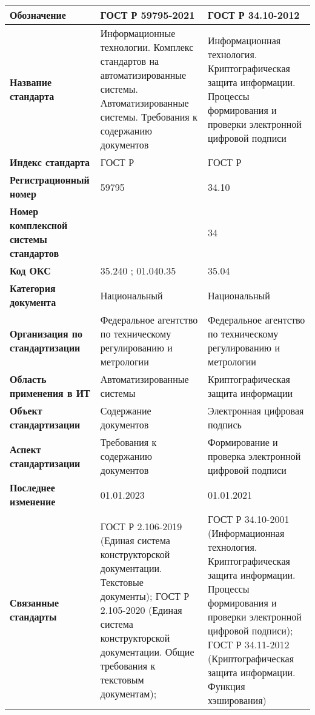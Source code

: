 \begin{table}[h!tp]
	\centering
	\caption{}
	\label{table:national}
	\begin{tabular}{|p{10em}|p{12em}|p{12em}|}
		\hline
		\textbf{Обозначение}
			& \textbf{ГОСТ Р 59795-2021} & \textbf{ГОСТ Р 34.10-2012} \\ \hline
		\textbf{Название стандарта}
			& Информационные технологии. Комплекс стандартов на автоматизированные системы. Автоматизированные системы. Требования к содержанию документов
			& Информационная технология. Криптографическая защита информации. Процессы формирования и проверки электронной цифровой подписи \\ \hline
		\textbf{Индекс стандарта}
			& ГОСТ Р & ГОСТ Р \\ \hline
		\textbf{Регистрационный номер}
			& 59795 & 34.10 \\ \hline
		\textbf{Номер комплексной системы стандартов}
			& & 34 \\ \hline
		\textbf{Код ОКС}
			& 35.240 ; 01.040.35 & 35.04 \\ \hline
		\textbf{Категория документа}
			& Национальный & Национальный \\ \hline
		\textbf{Организация по стандартизации}
			& Федеральное агентство по техническому регулированию и метрологии
			& Федеральное агентство по техническому регулированию и метрологии \\ \hline
		\textbf{Область применения в ИТ}
			& Автоматизированные системы
			& Криптографическая защита информации \\ \hline
		\textbf{Объект стандартизации}
			& Содержание документов & Электронная цифровая подпись \\ \hline
		\textbf{Аспект стандартизации}
			& Требования к содержанию документов
			& Формирование и проверка электронной цифровой подписи \\ \hline
		\textbf{Последнее изменение}
			& 01.01.2023 & 01.01.2021 \\ \hline
		\textbf{Связанные стандарты}
			& ГОСТ Р 2.106-2019 (Единая система конструкторской документации.
			Текстовые документы);
			ГОСТ Р 2.105-2020 (Единая система конструкторской документации.
			Общие требования к текстовым документам);
			& ГОСТ Р 34.10-2001 (Информационная технология.
			Криптографическая защита информации.
			Процессы формирования и проверки электронной цифровой подписи);
			ГОСТ Р 34.11-2012 (Криптографическая защита информации.
			Функция хэширования) \\ \hline
	\end{tabular}
\end{table}

